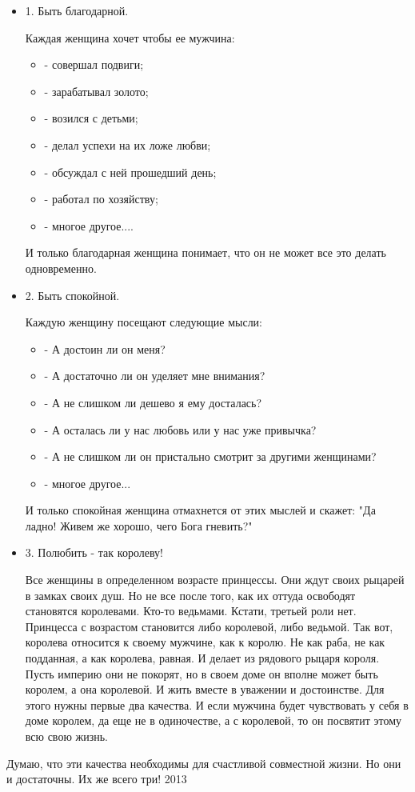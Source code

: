 \begin{itemize}
\item 1. Быть благодарной.

Каждая женщина хочет чтобы ее мужчина:

\begin{itemize}
  \item - совершал подвиги;
  \item - зарабатывал золото;
  \item - возился с детьми;
  \item - делал успехи на их ложе любви;
  \item - обсуждал с ней прошедший день;
  \item - работал по хозяйству;
  \item - многое другое....
\end{itemize}

И только благодарная женщина понимает, что он не может все это делать одновременно.

\item 2. Быть спокойной.

Каждую женщину посещают следующие мысли:

\begin{itemize}
  \item - А достоин ли он меня?
  \item - А достаточно ли он уделяет мне внимания?
  \item - А не слишком ли  дешево я ему досталась?
  \item - А осталась ли у нас любовь или у нас уже привычка?
  \item - А не слишком ли он пристально смотрит за другими женщинами?
  \item - многое другое...
\end{itemize}

И только спокойная женщина отмахнется от этих мыслей и скажет: "Да ладно! Живем же хорошо, чего Бога гневить?"

\item 3. Полюбить - так королеву!

Все женщины в определенном возрасте принцессы. Они ждут своих рыцарей в замках
своих душ. Но не все после того, как их оттуда освободят становятся королевами.
Кто-то ведьмами. Кстати, третьей роли нет. Принцесса с возрастом становится
либо королевой, либо ведьмой. Так вот, королева относится к своему мужчине, как
к королю. Не как раба, не как подданная, а как королева, равная. И делает из
рядового рыцаря короля. Пусть империю они не покорят, но в своем доме он вполне
может быть королем, а она королевой. И жить вместе в уважении и достоинстве.
Для этого нужны первые два качества. И если мужчина будет чувствовать у себя в
доме королем, да еще не в одиночестве, а с королевой, то он посвятит этому всю
свою жизнь.
	
\end{itemize}

Думаю, что эти качества необходимы для счастливой совместной жизни. Но они и
достаточны. Их же всего три!  2013
